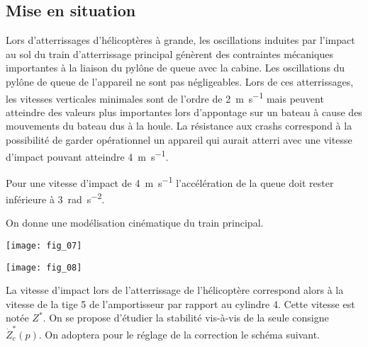 \ifprof
\begin{multicols}{2}
\else
\begin{multicols}{2}
\fi


\section*{Mise en situation}
\ifprof
\else
Lors d’atterrissages d'hélicoptères à grande, les oscillations induites par l'impact au sol du train
d'atterrissage principal génèrent des contraintes mécaniques importantes à la liaison du pylône de queue avec
la cabine. Les oscillations du pylône de queue de l’appareil ne sont pas négligeables.
Lors de ces atterrissages, les vitesses verticales minimales sont de l’ordre de \SI{2}{m.s^{-1}} mais peuvent atteindre des valeurs plus importantes lors d’appontage sur un bateau à cause des mouvements du bateau dus à la houle.
La résistance aux crashs correspond à la possibilité de garder opérationnel un appareil qui aurait atterri avec
une vitesse d'impact pouvant atteindre \SI{4}{m.s^{-1}}.
\fi
\begin{obj}
Pour une vitesse d'impact de \SI{4}{m.s^{-1}} l'accélération de la queue doit rester inférieure à \SI{3}{rad.s^{-2}}.
\end{obj}

\ifprof
\else

On donne une modélisation cinématique du train principal. 
\begin{center}
\begin{minipage}[c]{.48\linewidth}
\begin{center}
\texttt{[image: fig\_07]}
\end{center}
\end{minipage} \hfill
\begin{minipage}[c]{.48\linewidth}
\begin{center}
\texttt{[image: fig\_08]}
\end{center}
\end{minipage} \end{center}
La vitesse d'impact lors de l'atterrissage de l'hélicoptère correspond alors à la vitesse de la tige 5 de l'amportisseur par rapport au cylindre 4. Cette vitesse est notée $Z^*$. On se propose d'étudier la stabilité vis-à-vis de la seule consigne  $\dot{Z}_c^*(p)$. On adoptera pour le réglage de la correction le schéma suivant.


\end{multicols}
\end{multicols}
